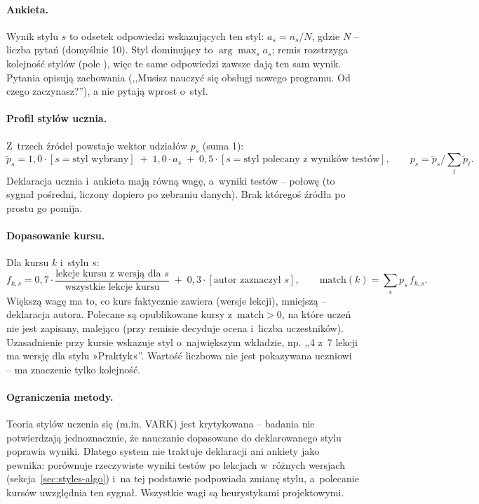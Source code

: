 \paragraph{Ankieta.} Wynik stylu $s$ to odsetek odpowiedzi wskazujących ten styl:
$a_s = n_s / N$, gdzie $N$ -- liczba pytań (domyślnie 10). Styl dominujący to
$\arg\max_s a_s$; remis rozstrzyga kolejność stylów (pole ), więc te same odpowiedzi
zawsze dają ten sam wynik. Pytania opisują zachowania (,,Musisz nauczyć się obsługi nowego
programu. Od czego zaczynasz?''), a nie pytają wprost o~styl.

\paragraph{Profil stylów ucznia.} Z~trzech źródeł powstaje wektor udziałów $p_s$ (suma 1):
\[
\tilde p_s = 1{,}0\cdot[s = \text{styl wybrany}] \;+\; 1{,}0\cdot a_s \;+\; 0{,}5\cdot[s = \text{styl polecany z~wyników testów}],
\qquad p_s = \tilde p_s \Big/ \textstyle\sum_t \tilde p_t .
\]
Deklaracja ucznia i~ankieta mają równą wagę, a~wyniki testów -- połowę (to sygnał pośredni, liczony
dopiero po zebraniu danych). Brak któregoś źródła po prostu go pomija.

\paragraph{Dopasowanie kursu.} Dla kursu $k$ i~stylu $s$:
\[
f_{k,s} = 0{,}7\cdot\frac{\text{lekcje kursu z~wersją dla } s}{\text{wszystkie lekcje kursu}} \;+\; 0{,}3\cdot[\text{autor zaznaczył } s],
\qquad \text{match}(k) = \sum_s p_s\, f_{k,s}.
\]
Większą wagę ma to, co kurs faktycznie zawiera (wersje lekcji), mniejszą -- deklaracja autora.
Polecane są opublikowane kursy z~$\text{match}>0$, na które uczeń nie jest zapisany, malejąco
(przy remisie decyduje ocena i~liczba uczestników). Uzasadnienie przy kursie wskazuje styl
o~największym wkładzie, np. ,,4 z~7 lekcji ma wersję dla stylu »Praktyk«''. Wartość liczbowa nie
jest pokazywana uczniowi -- ma znaczenie tylko kolejność.

\paragraph{Ograniczenia metody.} Teoria stylów uczenia się (m.in. VARK) jest krytykowana -- badania
nie potwierdzają jednoznacznie, że nauczanie dopasowane do deklarowanego stylu poprawia wyniki.
Dlatego system nie traktuje deklaracji ani ankiety jako pewnika: porównuje rzeczywiste wyniki testów
po lekcjach w~różnych wersjach (sekcja~\ref{sec:styles-algo}) i~na tej podstawie podpowiada zmianę
stylu, a~polecanie kursów uwzględnia ten sygnał. Wszystkie wagi są heurystykami projektowymi.

